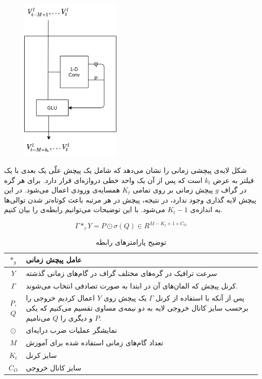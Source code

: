 \begin{figure}
  \includegraphics[height=8cm]{./images/time-conv.png}
  \centering
  \label{fig:time-conv}
\end{figure}

شکل  لایه‌ی پیچشی زمانی را نشان می‌دهد که شامل یک پیچش علّی یک بعدی
با یک فیلتر به عرض  $k_{t}$ است که پس از آن یک واحد خطی دروازه‌ای قرار دارد.
برای هر گره در گراف $g$ پیچش زمانی بر روی تمامی $K_{t}$ همسایه‌ی ورودی اعمال می‌شود.
در این پیچش لایه گذاری وجود ندارد‌‌، در نتیجه، پیچش در هر مرتبه باعث کوتاه‌تر شدن توالی‌ها به اندازه‌ی $K_{t}-1$ می‌شود.
با این توضیحات می‌توانیم رابطه‌ی  را بیان کنیم.

\begin{equation}
  \Gamma *_{\tau} Y = P \odot \sigma (Q) \in R^{M-K_{t}+1 \times C_{O}}
  \label{eq:time-conv}
\end{equation}

\begin{table}[h]
  \centering
  \caption{توضیح پارامترهای رابطه }
  \begin{tabular}{|c|p{}|}
    \hline
    $*_{g}$ & عامل پیچش زمانی \\
    \hline
    $Y$ & سرعت ترافیک در گره‌های مختلف گراف در گام‌های زمانی گذشته \\
    \hline
    $\Gamma$ & کرنل پیچش که المان‌های آن در ابتدا به صورت تصادفی انتخاب می‌شوند. \\
    \hline
    $P$, $Q$ & پس از آنکه با استفاده از کرنل $\Gamma$ یک پیچش روی $Y$ اعمال کردیم خروجی را برحسب سایز کانال خروجی لایه به دو نیمه‌ی مساوی تقسیم می‌کنیم که یکی $P$ و دیگری را $Q$ می‌نامیم. \\
    \hline
    $\odot$ & نمایشگر عملیات ضرب درایه‌ای \\
    \hline
    $M$ & تعداد گام‌های زمانی استفاده شده برای آموزش \\
    \hline
    $K_{t}$ & سایز کرنل \\
    \hline
    $C_{O}$ & سایز کانال خروجی \\
    \hline
  \end{tabular}
  \label{tbl:distance}
\end{table}

